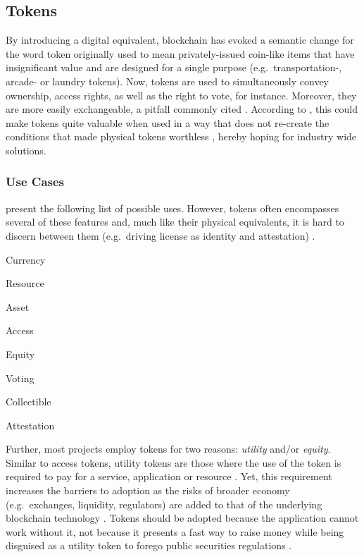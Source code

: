 \subsection{Tokens}
\label{sec:tokens}
By introducing a digital equivalent, blockchain has evoked a semantic change for the word token originally used to mean privately-issued coin-like items that have insignificant value and are designed for a single purpose (e.g.~transportation-, arcade- or laundry tokens). Now, tokens are used to simultaneously convey ownership, access rights, as well as the right to vote, for instance. Moreover, they are more easily exchangeable, a pitfall commonly cited \cite[p.~173]{Antonopoulos.2018}. According to \citeauthor{Antonopoulos.2018}, this could make tokens quite valuable when used in a way that does not re-create the conditions that made physical tokens worthless \cite[p.~178]{Antonopoulos.2018}, hereby hoping for industry wide solutions. 

\subsubsection{Use Cases}
\citeauthor{Antonopoulos.2018} present the following list of possible uses. However, tokens often encompasses several of these features and, much like their physical equivalents, it is hard to discern between them (e.g.~driving license as identity and attestation) \cite[pp.~173--174]{Antonopoulos.2018}.

\begin{AutoMultiColItemize}
  \item Currency
  \item Resource
  \item Asset
  \item Access
  \item Equity
  \item Voting
  \item Collectible
  \item Attestation
\end{AutoMultiColItemize}


Further, most projects employ tokens for two reasons: \textit{utility} and/or \textit{equity}. Similar to access tokens, utility tokens are those where the use of the token is required to pay for a service, application or resource \cite[p.~176]{Antonopoulos.2018}. Yet, this requirement increases the barriers to adoption as the risks of broader economy (e.g.~exchanges, liquidity, regulators) are added to that of the underlying blockchain technology \cite[pp.~177]{Antonopoulos.2018}. Tokens should be adopted because the application cannot work without it, not because it presents a fast way to raise money while being disguised as a utility token to forego public securities regulations \cite[p.~178]{Antonopoulos.2018}.

